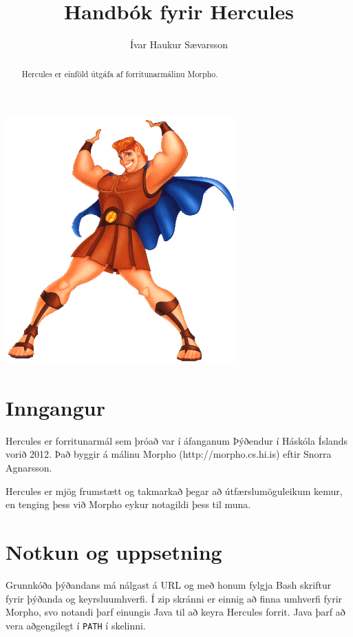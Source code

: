 \documentclass[12pt,a4paper]{article}
\begin{document}
\sloppy
\title{Handbók fyrir Hercules}
\author{Ívar Haukur Sævarsson}
\maketitle
\begin{center}
\includegraphics{hercules.png}
\end{center}
\pagebreak

\begin{abstract}
Hercules er einföld útgáfa af forritunarmálinu Morpho.
\end{abstract}

\tableofcontents

\section{Inngangur}
Hercules er forritunarmál sem þróað var í áfanganum Þýðendur í Háskóla Íslands vorið 2012.
Það byggir á málinu Morpho (http://morpho.cs.hi.is) eftir Snorra Agnarsson.

Hercules er mjög frumstætt og takmarkað þegar að útfærslumöguleikum kemur, en tenging þess við Morpho
eykur notagildi þess til muna.
\section{Notkun og uppsetning}
Grunnkóða þýðandans má nálgast á URL og með honum fylgja Bash skriftur fyrir
þýðanda og keyrsluumhverfi. Í zip skránni er einnig að finna umhverfi fyrir Morpho, svo notandi þarf einungis Java
til að keyra Hercules forrit. Java þarf að vera aðgengilegt í {\tt PATH} í skelinni.
\end{document}
